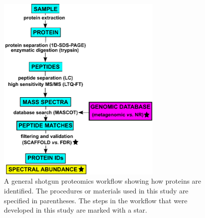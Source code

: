 \begin{figure}
\centering
\includegraphics[width=80mm]{ace_figures/workflow.pdf}
\caption[General shotgun proteomics workflow]{A general shotgun proteomics workflow showing how proteins are identified. The procedures or materials used in this study are specified in parentheses. The steps in the workflow that were developed in this study are marked with a star.
}
\label{fig:workflow}

\end{figure}
